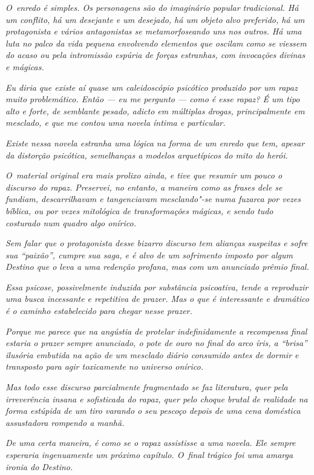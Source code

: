 \emph{O~enredo é simples. Os personagens são do imaginário popular
tradicional. Há um conflito, há um desejante e um desejado, há um objeto
alvo preferido, há um protagonista e vários antagonistas se
metamorfoseando uns nos outros. Há uma luta no palco da vida pequena
envolvendo elementos que oscilam como se viessem do acaso ou pela
intromissão espúria de forças estranhas, com invocações divinas e
mágicas.}

\emph{Eu diria que existe aí quase um caleidoscópio psicótico produzido
por um rapaz muito problemático. Então --- eu me pergunto --- como é
esse rapaz? É um tipo alto e forte, de semblante pesado, adicto em
múltiplas drogas, principalmente em mesclado, e que me contou uma novela
íntima e particular.}

\emph{Existe nessa novela estranha uma lógica na forma de um enredo que
tem, apesar da distorção psicótica, semelhanças a modelos arquetípicos
do mito do herói.}

\emph{O~material original era mais prolixo ainda, e tive que resumir um
pouco o discurso do rapaz. Preservei, no entanto, a maneira como as
frases dele se fundiam, descarrilhavam e tangenciavam mesclando"-se numa
fuzarca por vezes bíblica, ou por vezes mitológica de transformações
mágicas, e sendo tudo costurado num quadro algo onírico.}

\emph{Sem falar que o protagonista desse bizarro discurso tem alianças
suspeitas e sofre sua ``paixão'', cumpre sua saga, e é alvo de um
sofrimento imposto por algum Destino que o leva a uma redenção profana,
mas com um anunciado prêmio final.}

\emph{Essa psicose, possivelmente induzida por substância psicoativa,
tende a reproduzir uma busca incessante e repetitiva de prazer. Mas o
que é interessante e dramático é o caminho estabelecido para chegar
nesse prazer.}

\emph{Porque me parece que na angústia de protelar indefinidamente a
recompensa final estaria o prazer sempre anunciado, o pote de ouro no
final do arco íris, a ``brisa'' ilusória embutida na ação de um mesclado
diário consumido antes de dormir e transposto para agir toxicamente no
universo onírico.}

\emph{Mas todo esse discurso parcialmente fragmentado se faz literatura,
quer pela irreverência insana e sofisticada do rapaz, quer pelo choque
brutal de realidade na forma estúpida de um tiro varando o seu pescoço
depois de uma cena doméstica assustadora rompendo a manhã.}

\emph{De uma certa maneira, é como se o rapaz assistisse a uma novela.
Ele sempre esperaria ingenuamente um próximo capítulo. O~final trágico
foi uma amarga ironia do Destino.}


